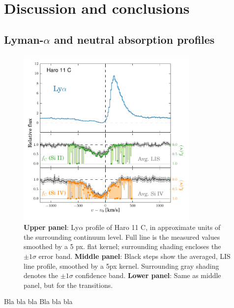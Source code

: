 \documentclass[preprint2]{aastex6}
\begin{document}
\section{Discussion and conclusions}\label{discussion-and-conclusions}

\subsection{Lyman-$\alpha$ and neutral absorption
profiles}\label{sec:LISLya}

\begin{figure}
\centering
\includegraphics[width=3.500in]{../Figs/LyACoverfracs.pdf}
\caption{\textbf{Upper panel}: Ly$\alpha$ profile of Haro 11 C, in
approximate units of the surrounding continuum level. Full line is the
measured values smoothed by a 5 px. flat kernel; surrounding shading
encloses the $\pm 1 \sigma$ error band. \textbf{Middle panel}: Black
steps show the averaged, LIS line profile, smoothed by a 5px kernel.
Surrounding gray shading denotes the $\pm 1 \sigma$ confidence band.
\textbf{Lower panel}: Same as middle panel, but for the 
transitions.}\label{fig:HisLisLya}
\end{figure}

Bla bla bla Bla bla bla


\end{document}
